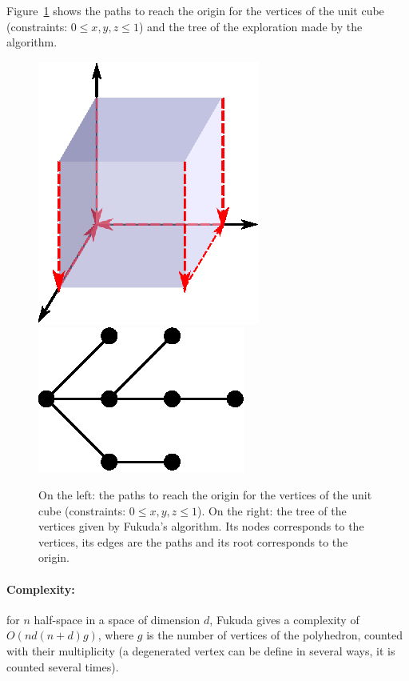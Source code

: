 Figure~\ref{ex_fuku} shows the paths to reach the origin for the vertices of the unit cube (constraints: $0\leq x,y,z \leq 1$) and the tree of the exploration made by the algorithm.

\vspace*{-1cm}

\begin{figure}
\includegraphics[scale=1.1]{images/fukuda.eps}
\hspace*{0.5cm}
\includegraphics[scale=1]{images/fukugraph.eps}
\caption{On the left:  the paths to reach the origin for the vertices of the unit cube (constraints: $0\leq x,y,z \leq 1$). On the right: the tree of the vertices given by Fukuda's algorithm. Its nodes corresponds to the vertices, its edges are the paths and its root corresponds to the origin.}
\label{ex_fuku}
\end{figure}

\paragraph{Complexity:} for $n$ half-space in a space of dimension $d$, Fukuda gives a complexity of $O(nd(n+d)g)$, where $g$ is the number of vertices of the polyhedron, counted with their multiplicity (a degenerated vertex can be define in several ways, it is counted several times). 
